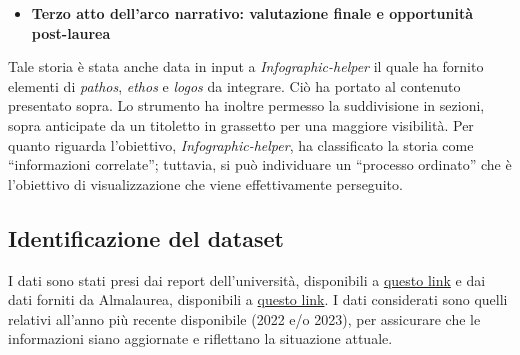 \begin{itemize}
    \item \textbf{Terzo atto dell'arco narrativo: valutazione finale e opportunità post-laurea}
\end{itemize}
Tale storia è stata anche data in input a \emph{Infographic-helper} il quale ha fornito elementi di \emph{pathos}, \emph{ethos} e \emph{logos} da integrare.
Ciò ha portato al contenuto presentato sopra.
Lo strumento ha inoltre permesso la suddivisione in sezioni, sopra anticipate da un titoletto in grassetto per una maggiore visibilità.
Per quanto riguarda l'obiettivo, \emph{Infographic-helper}, ha classificato la storia come ``informazioni correlate''; tuttavia, si può individuare un ``processo ordinato'' 
che è l'obiettivo di visualizzazione che viene effettivamente perseguito.


\subsection{Identificazione del dataset}
I dati sono stati presi dai report dell'università, disponibili a \href{https://www.unipd.it/dati-statistici}{questo link} e dai dati forniti
da Almalaurea, disponibili a \href{https://apex.cca.unipd.it/pls/apex/f?p=144:32:::::P32_CODICIONE,P32_COD_CDS,P32_CODICE_SEDE,P32_TIPO_CORSO:0280106203100001,SC1167,PD,L2023}{questo link}.
I dati considerati sono quelli relativi all'anno più recente disponibile (2022 e/o 2023), per assicurare che le informazioni siano aggiornate e riflettano la situazione attuale.

